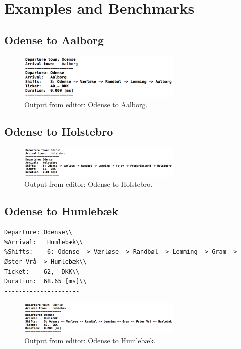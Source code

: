 \section{Examples and Benchmarks}



\subsection{Odense to Aalborg}

\begin{figure}[th!]
\centering
\includegraphics[width=0.7\textwidth]{./graphics/ex1}
\caption{Output from editor: Odense to Aalborg.}
\label{fig:odense_Aalborg}
\end{figure}

	
\subsection{Odense to Holstebro}

\begin{figure}[th!]
\centering
\includegraphics[width=0.7\textwidth]{./graphics/ex2}
\caption{Output from editor: Odense to Holstebro.}
\label{fig:odense_holstebro}
\end{figure}

\subsection{Odense to Humlebæk}


\begin{lstlisting}[frame=single]
Departure: Odense\\
%Arrival:   Humlebæk\\
%Shifts:    6: Odense -> Værløse -> Randbøl -> Lemming -> Gram -> Øster Vrå -> Humlebæk\\
Ticket:    62,- DKK\\
Duration:  68.65 [ms]\\
---------------------
\end{lstlisting}

\begin{figure}[th!]
\centering
\includegraphics[width=0.7\textwidth]{./graphics/ex3}
\caption{Output from editor: Odense to Humlebæk.}
\label{fig:odense_humlebæk}
\end{figure}






